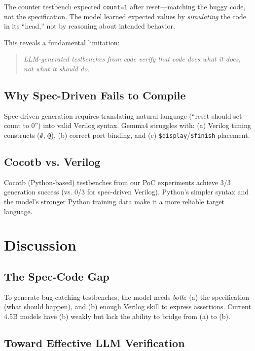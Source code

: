 \documentclass[conference]{IEEEtran}
\begin{document}
The counter testbench expected \texttt{count=1} after reset---matching
the buggy code, not the specification. The model learned expected
values by \emph{simulating} the code in its ``head,'' not by
reasoning about intended behavior.

This reveals a fundamental limitation:
\begin{quote}
\emph{LLM-generated testbenches from code verify that code does
what it does, not what it should do.}
\end{quote}

\subsection{Why Spec-Driven Fails to Compile}

Spec-driven generation requires translating natural language
(``reset should set count to 0'') into valid Verilog syntax.
Gemma4 struggles with:
(a) Verilog timing constructs (\texttt{\#}, \texttt{@}),
(b) correct port binding, and
(c) \texttt{\$display}/\texttt{\$finish} placement.

\subsection{Cocotb vs. Verilog}

Cocotb (Python-based) testbenches from our PoC experiments achieve
3/3 generation success (vs. 0/3 for spec-driven Verilog). Python's
simpler syntax and the model's stronger Python training data
make it a more reliable target language.

\section{Discussion}

\subsection{The Spec-Code Gap}

To generate bug-catching testbenches, the model needs \emph{both}:
(a) the specification (what should happen), and (b) enough Verilog
skill to express assertions. Current 4.5B models have (b) weakly
but lack the ability to bridge from (a) to (b).

\subsection{Toward Effective LLM Verification}
\end{document}
